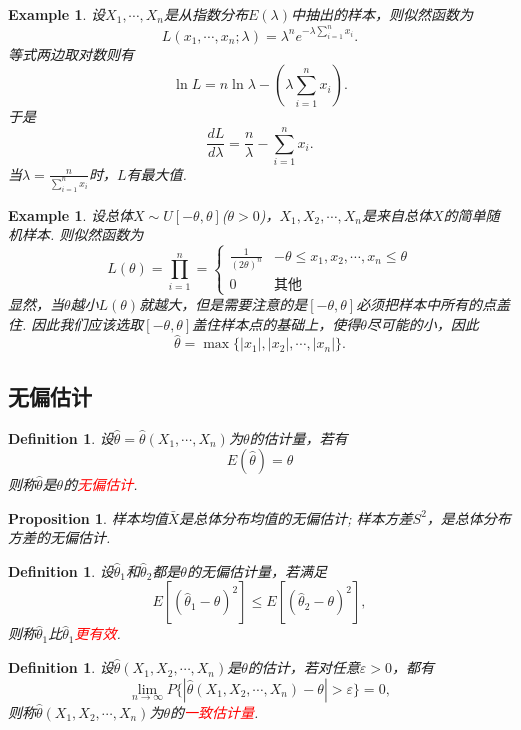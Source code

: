\documentclass{article}
\newtheorem{proposition}[theorem]{Proposition}
\newtheorem{example}[theorem]{Example}
\newtheorem{definition}[theorem]{Definition}
\newcommand{\redt}[1]{\textcolor{red}{#1}}
\begin{document}
\begin{example}
\rm 设$X_1,\cdots,X_n$是从指数分布$E(\lambda)$中抽出的样本，则似然函数为
$$
L(x_1,\cdots,x_n;\lambda) = \lambda^n e^{-\lambda\sum\limits_{i=1}^{n} x_i}. 
$$
等式两边取对数则有
$$
\ln L = n\ln\lambda - \left(\lambda\sum\limits_{i=1}^{n} x_i\right). 
$$
于是
$$
\frac{dL}{d\lambda} = \frac{n}{\lambda} - \sum\limits_{i=1}^{n} x_i. 
$$
当$\lambda = \frac{n}{\sum\limits_{i=1}^{n} x_i}$时，$L$有最大值. 
\end{example}

\begin{example}
\rm 设总体$X \sim U[-\theta,\theta]$($\theta >0$)，$X_1,X_2,\cdots,X_n$是来自总体$X$的简单随机样本. 则似然函数为
$$
L(\theta) = \prod_{i=1}^{n} = \left\{ \begin{array}{ll}
\frac{1}{(2\theta)^n} & -\theta \leq x_1,x_2,\cdots,x_n \leq \theta \\
0 & \text{其他}
\end{array} \right.
$$
显然，当$\theta$越小$L(\theta)$就越大，但是需要注意的是$[-\theta,\theta]$必须把样本中所有的点盖住. 因此我们应该选取$[-\theta,\theta]$盖住样本点的基础上，使得$\theta$尽可能的小，因此
$$
\widehat{\theta} = \max\{|x_1|,|x_2|,\cdots,|x_n|\}. 
$$
\end{example}

\subsection{无偏估计}

\begin{definition}
\rm 设$\widehat{\theta} = \widehat{\theta}(X_1,\cdots,X_n)$为$\theta$的估计量，若有
$$
E(\widehat{\theta}) = \theta
$$
则称$\widehat{\theta}$是$\theta$的\redt{无偏估计}.
\end{definition}


\begin{proposition}
\rm 样本均值$\bar{X}$是总体分布均值的无偏估计; 样本方差$S^2$，是总体分布方差的无偏估计.
\end{proposition}

\begin{definition}
\rm 设$\widehat{\theta}_1$和$\widehat{\theta}_2$都是$\theta$的无偏估计量，若满足
$$
E[(\widehat{\theta}_1-\theta)^2] \leq E[(\widehat{\theta}_2-\theta)^2],
$$
则称$\widehat{\theta}_1$比$\widehat{\theta}_1$\redt{更有效}. 
\end{definition}

\begin{definition}
\rm 设$\widehat{\theta}(X_1,X_2,\cdots,X_n)$是$\theta$的估计，若对任意$\varepsilon > 0$，都有
$$
\lim\limits_{n \to \infty} P\{|\widehat{\theta}(X_1,X_2,\cdots,X_n)-\theta| > \varepsilon \} = 0,
$$
则称$\widehat{\theta}(X_1,X_2,\cdots,X_n)$为$\theta$的\redt{一致估计量}. 
\end{definition}
\end{document}
